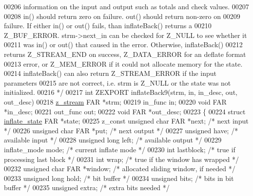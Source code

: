 \begin{DoxyCode}
{{{{00206 \textcolor{comment}{   information on the input and output such as totals and check values.}
00207 \textcolor{comment}{}
00208 \textcolor{comment}{   in() should return zero on failure.  out() should return non-zero on}
00209 \textcolor{comment}{   failure.  If either in() or out() fails, than inflateBack() returns a}
00210 \textcolor{comment}{   Z\_BUF\_ERROR.  strm->next\_in can be checked for Z\_NULL to see whether it}
00211 \textcolor{comment}{   was in() or out() that caused in the error.  Otherwise,  inflateBack()}
00212 \textcolor{comment}{   returns Z\_STREAM\_END on success, Z\_DATA\_ERROR for an deflate format}
00213 \textcolor{comment}{   error, or Z\_MEM\_ERROR if it could not allocate memory for the state.}
00214 \textcolor{comment}{   inflateBack() can also return Z\_STREAM\_ERROR if the input parameters}
00215 \textcolor{comment}{   are not correct, i.e. strm is Z\_NULL or the state was not initialized.}
00216 \textcolor{comment}{ */}
00217 \textcolor{keywordtype}{int} ZEXPORT inflateBack9(strm, in, in\_desc, out, out\_desc)
00218 \hyperlink{structz__stream__s}{z\_stream} FAR *strm;
00219 in\_func in;
00220 \textcolor{keywordtype}{void} FAR *in\_desc;
00221 out\_func out;
00222 \textcolor{keywordtype}{void} FAR *out\_desc;
00223 \{
00224     \textcolor{keyword}{struct }\hyperlink{structinflate__state}{inflate\_state} FAR *state;
00225     z\_const \textcolor{keywordtype}{unsigned} \textcolor{keywordtype}{char} FAR *next;    \textcolor{comment}{/* next input */}
00226     \textcolor{keywordtype}{unsigned} \textcolor{keywordtype}{char} FAR *put;     \textcolor{comment}{/* next output */}
00227     \textcolor{keywordtype}{unsigned} have;              \textcolor{comment}{/* available input */}
00228     \textcolor{keywordtype}{unsigned} \textcolor{keywordtype}{long} left;         \textcolor{comment}{/* available output */}
00229     inflate\_mode mode;          \textcolor{comment}{/* current inflate mode */}
00230     \textcolor{keywordtype}{int} lastblock;              \textcolor{comment}{/* true if processing last block */}
00231     \textcolor{keywordtype}{int} wrap;                   \textcolor{comment}{/* true if the window has wrapped */}
00232     \textcolor{keywordtype}{unsigned} \textcolor{keywordtype}{char} FAR *window;  \textcolor{comment}{/* allocated sliding window, if needed */}
00233     \textcolor{keywordtype}{unsigned} \textcolor{keywordtype}{long} hold;         \textcolor{comment}{/* bit buffer */}
00234     \textcolor{keywordtype}{unsigned} bits;              \textcolor{comment}{/* bits in bit buffer */}
00235     \textcolor{keywordtype}{unsigned} extra;             \textcolor{comment}{/* extra bits needed */}
}}}}
\end{DoxyCode}
